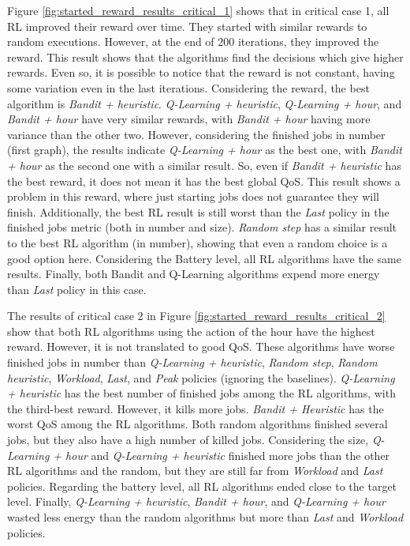 Figure \ref{fig:started_reward_results_critical_1} shows that in critical case 1, all RL improved their reward over time. They started with similar rewards to random executions. However, at the end of 200 iterations, they improved the reward. This result shows that the algorithms find the decisions which give higher rewards. Even so, it is possible to notice that the reward is not constant, having some variation even in the last iterations. Considering the reward, the best algorithm is \emph{Bandit + heuristic}. \emph{Q-Learning + heuristic}, \emph{Q-Learning + hour}, and \emph{Bandit + hour} have very similar rewards, with \emph{Bandit + hour} having more variance than the other two. However, considering the finished jobs in number (first graph), the results indicate \emph{Q-Learning + hour} as the best one, with \emph{Bandit + hour} as the second one with a similar result. So, even if \emph{Bandit + heuristic} has the best reward, it does not mean it has the best global QoS. This result shows a problem in this reward, where just starting jobs does not guarantee they will finish. Additionally, the best RL result is still worst than the \emph{Last} policy in the finished jobs metric (both in number and size). \emph{Random step} has a similar result to the best RL algorithm (in number), showing that even a random choice is a good option here. Considering the Battery level, all RL algorithms have the same results. Finally, both Bandit and Q-Learning algorithms expend more energy than \emph{Last} policy in this case.

The results of critical case 2 in Figure \ref{fig:started_reward_results_critical_2} show that both RL algorithms using the action of the hour have the highest reward. However, it is not translated to good QoS. These algorithms have worse finished jobs in number than \emph{Q-Learning + heuristic}, \emph{Random step}, \emph{Random heuristic}, \emph{Workload}, \emph{Last}, and \emph{Peak} policies (ignoring the baselines). \emph{Q-Learning + heuristic} has the best number of finished jobs among the RL algorithms, with the third-best reward. However, it kills more jobs. \emph{Bandit + Heuristic} has the worst QoS among the RL algorithms. Both random algorithms finished several jobs, but they also have a high number of killed jobs. Considering the size, \emph{Q-Learning + hour} and \emph{Q-Learning + heuristic} finished more jobs than the other RL algorithms and the random, but they are still far from \emph{Workload} and \emph{Last} policies. Regarding the battery level, all RL algorithms ended close to the target level. Finally, \emph{Q-Learning + heuristic}, \emph{Bandit + hour}, and \emph{Q-Learning + hour} wasted less energy than the random algorithms but more than \emph{Last} and \emph{Workload} policies.

